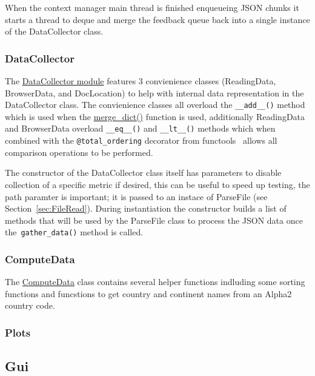 \documentclass[11pt]{article}
\newcommand{\code}[1]{\colorbox{light-gray}{\texttt{#1}}}
\begin{document}
When the context manager main thread is finished enqueueing JSON chunks it starts a thread to deque and merge the feedback queue back into a single instance of the DataCollector class.

\subsubsection{DataCollector}
The \href{https://www2.macs.hw.ac.uk/~sf52/DocuTrace/html/DocuTrace.Analysis.html#module-DocuTrace.Analysis.DataCollector}{DataCollector module} features 3 convienience classes (ReadingData, BrowserData, and DocLocation) to help with internal data representation in the DataCollector class. The convienience classes all overload the \code{\_\_add\_\_()} method which is used when the \href{https://www2.macs.hw.ac.uk/~sf52/DocuTrace/html/DocuTrace.Analysis.html#DocuTrace.Analysis.DataCollector.merge_dict}{merge\_dict()} function is used, additionally ReadingData and BrowserData overload \code{\_\_eq\_\_()} and \code{\_\_lt\_\_()} methods which when combined with the \code{@total\_ordering} decorator from functools~\autocite{FunctoolsHigherorderFunctions} allows all comparison operations to be performed.

The constructor of the DataCollector class itself has parameters to disable collection of a specific metric if desired, this can be useful to speed up testing, the path paramter is important; it is passed to an instace of ParseFile (see Section~\ref{sec:FileRead}). During instantiation the constructor builds a list of methods that will be used by the ParseFile class to process the JSON data once the~\code{gather\_data()} method is called.

\subsubsection{ComputeData}
The \href{https://www2.macs.hw.ac.uk/~sf52/DocuTrace/html/DocuTrace.Analysis.html#module-DocuTrace.Analysis.ComputeData}{ComputeData} class contains several helper functions indluding some sorting functions and funcstions to get country and continent names from an Alpha2 country code.


\subsubsection{Plots}

\subsection{Gui}
\end{document}
